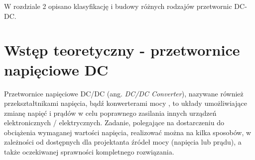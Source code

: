 W rozdziale 2 opisano klasyfikację i budowy różnych rodzajów przetwornic DC-DC.

\section{Wstęp teoretyczny - przetwornice napięciowe DC}

Przetwornice napięciowe DC/DC (ang. \textit{DC/DC Converter}), nazywane również przekształtnikami napięcia, bądź konwerterami mocy 
\cite{przetworncieNapieciowe}, to układy umożliwiające zmianę napięć i prądów w celu poprawnego zasilania 
innych urządzeń elektronicznych / elektrycznych. Zadanie, polegające na dostarczeniu do obciążenia wymaganej wartości napięcia, realizować można na kilka sposobów, w zależności od dostępnych dla projektanta źródeł mocy (napięcia lub prądu), a także oczekiwanej sprawności kompletnego rozwiązania.

